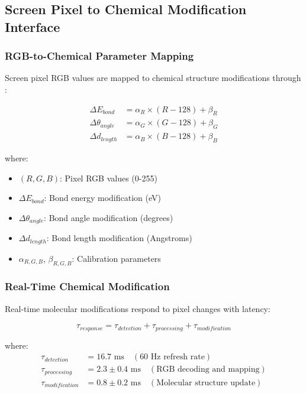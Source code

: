 \subsection{Screen Pixel to Chemical Modification Interface}

\subsubsection{RGB-to-Chemical Parameter Mapping}

Screen pixel RGB values are mapped to chemical structure modifications through \cite{jensen2017introduction}:

\begin{align}
\Delta E_{bond} &= \alpha_R \times (R - 128) + \beta_R \\
\Delta \theta_{angle} &= \alpha_G \times (G - 128) + \beta_G \\
\Delta d_{length} &= \alpha_B \times (B - 128) + \beta_B
\end{align}

where:
\begin{itemize}
\item $(R, G, B)$: Pixel RGB values (0-255)
\item $\Delta E_{bond}$: Bond energy modification (eV)
\item $\Delta \theta_{angle}$: Bond angle modification (degrees)
\item $\Delta d_{length}$: Bond length modification (Angstroms)
\item $\alpha_{R,G,B}$, $\beta_{R,G,B}$: Calibration parameters
\end{itemize}

\subsubsection{Real-Time Chemical Modification}

Real-time molecular modifications respond to pixel changes with latency:

\begin{equation}
\tau_{response} = \tau_{detection} + \tau_{processing} + \tau_{modification}
\end{equation}

where:
\begin{align}
\tau_{detection} &= 16.7 \text{ ms} \quad (\text{60 Hz refresh rate}) \\
\tau_{processing} &= 2.3 \pm 0.4 \text{ ms} \quad (\text{RGB decoding and mapping}) \\
\tau_{modification} &= 0.8 \pm 0.2 \text{ ms} \quad (\text{Molecular structure update})
\end{align}

